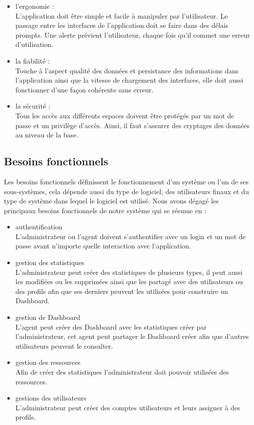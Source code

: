 \begin{itemize}
    \item l'ergonomie : \\
L’application doit être simple et facile à manipuler par l’utilisateur. Le passage entre les interfaces de l’application doit se faire dans des délais prompts. Une alerte prévient l’utilisateur, chaque fois qu’il commet une erreur d’utilisation.  
    \item la fiabilité : \\
Touche à l’aspect qualité des données et persistance des informations dans l’application ainsi que la vitesse de chargement des interfaces, elle doit aussi fonctionner d’une façon cohérente sans erreur.
    \item la sécurité : \\
Tous les accès aux différents espaces doivent être protégés par un mot de passe et un privilège d'accès. Ainsi, il faut s'assurer des cryptages des données au niveau de la base.
\end{itemize}

\subsection{Besoins fonctionnels}

Les besoins fonctionnels définissent le fonctionnement d’un système ou l’un de ses sous-systèmes, cela dépende aussi du type de logiciel, des utilisateurs finaux et du type de système dans lequel le logiciel est utilisé. Nous avons dégagé les principaux besoins fonctionnels de notre système qui se résume en :
\begin{itemize}
    \item authentification \\
    L’administrateur ou l’agent doivent s’authentifier avec un login et un mot de passe avant n’importe quelle interaction avec l’application.
    \item gestion des statistiques \\
    L’administrateur peut créer des statistiques de plusieurs types, il peut aussi les modifiées ou les supprimées ainsi que les partagé avec des utilisateurs ou des profils afin que ses derniers peuvent les utilisées pour construire un Dashboard.
    \item gestion de Dashboard \\
    L’agent peut créer des Dashboard avec les statistiques créer par l’administrateur, cet agent peut partager le Dashboard créer afin que d’autres utilisateurs peuvent le consulter.
    \item gestion des ressources \\
    Afin de créer des statistiques l’administrateur doit pouvoir utilisées des ressources.
    \item gestions des utilisateurs \\
    L’administrateur peut créer des comptes utilisateurs et leurs assigner à des profils.
\end{itemize}




